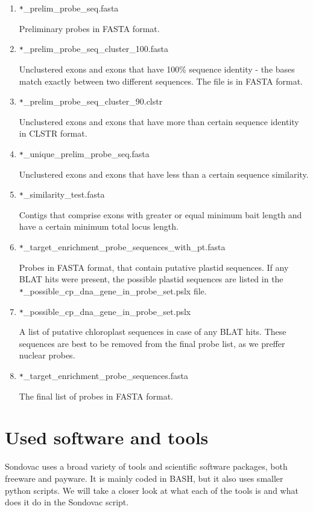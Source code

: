 \begin{enumerate}
\item \verb_*_\_prelim\_probe\_seq.fasta

Preliminary probes in FASTA format. 

\item \verb_*_\_prelim\_probe\_seq\_cluster\_100.fasta

Unclustered exons and exons that have 100\% sequence identity - the bases match exactly between two different sequences. The file is in 
FASTA format. 

\item \verb_*_\_prelim\_probe\_seq\_cluster\_90.clstr

Unclustered exons and exons that have more than certain sequence identity in CLSTR format. 

\item \verb_*_\_unique\_prelim\_probe\_seq.fasta

Unclustered exons and exons that have less than a certain sequence similarity. 

\item \verb_*_\_similarity\_test.fasta

Contigs that comprise exons with greater or equal minimum bait length and have a certain minimum total locus length. 

\item \verb_*_\_target\_enrichment\_probe\_sequences\_with\_pt.fasta

Probes in FASTA format, that contain putative plastid sequences. If any BLAT hits were present, the possible plastid sequences are listed in the 
\verb_*_\_possible\_cp\_dna\_gene\_in\_probe\_set.pslx file. 

\item \verb_*_\_possible\_cp\_dna\_gene\_in\_probe\_set.pslx

A list of putative chloroplast sequences in case of any BLAT hits. These sequences are best to be removed from the final probe list, as we preffer nuclear probes. 

\item \verb_*_\_target\_enrichment\_probe\_sequences.fasta

The final list of probes in FASTA format. 

\end{enumerate}


\section{Used software and tools}
Sondovac uses a broad variety of tools and scientific software packages, both freeware and payware. It is mainly coded in BASH, but it also uses smaller python 
scripts. We will take a closer look at what each of the tools is and what does it do in the Sondovac script. 

